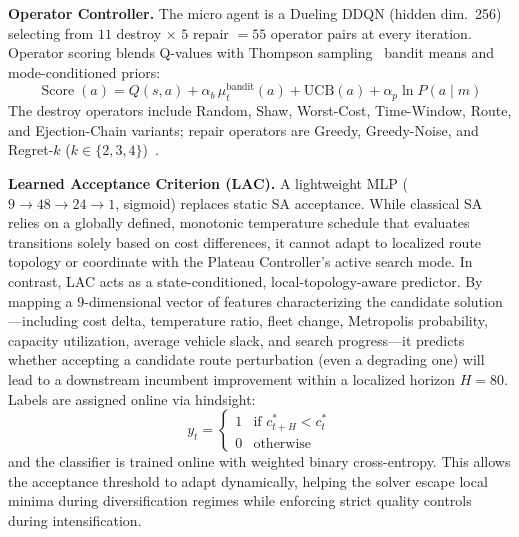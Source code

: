 \documentclass[conference]{IEEEtran}
\begin{document}
\textbf{Operator Controller.}
The micro agent is a Dueling DDQN (hidden dim.\ 256) selecting from
$11$ destroy $\times$ $5$ repair $= 55$ operator pairs at every
iteration.  Operator scoring blends Q-values with Thompson
sampling~\cite{thompson1933likelihood} bandit means and mode-conditioned
priors:
\begin{equation}
  \operatorname{Score}(a) = Q(s,a) + \alpha_b\,\mu_t^{\text{bandit}}(a)
    + \text{UCB}(a) + \alpha_p\ln P(a \mid m)
  \label{eq:score}
\end{equation}
The destroy operators include Random, Shaw, Worst-Cost, Time-Window, Route,
and Ejection-Chain variants; repair operators are Greedy, Greedy-Noise,
and Regret-$k$ ($k\!\in\!\{2,3,4\}$)~\cite{pisinger2007general}.

\textbf{Learned Acceptance Criterion (LAC).}
A lightweight MLP ($9{\to}48{\to}24{\to}1$, sigmoid) replaces static SA acceptance.
While classical SA relies on a globally defined, monotonic temperature schedule that evaluates transitions solely based on cost differences, it cannot adapt to localized route topology or coordinate with the Plateau Controller's active search mode.
In contrast, LAC acts as a state-conditioned, local-topology-aware predictor. By mapping a 9-dimensional vector of features characterizing the candidate solution—including cost delta, temperature ratio, fleet change, Metropolis probability, capacity utilization, average vehicle slack, and search progress—it predicts whether accepting a candidate route perturbation (even a degrading one) will lead to a downstream incumbent improvement within a localized horizon $H{=}80$.
Labels are assigned online via hindsight:
\begin{equation}
  y_t = \begin{cases}
    1 & \text{if } c^*_{t+H} < c^*_t \\
    0 & \text{otherwise}
  \end{cases}
  \label{eq:lac}
\end{equation}
and the classifier is trained online with weighted binary cross-entropy. This allows the acceptance threshold to adapt dynamically, helping the solver escape local minima during diversification regimes while enforcing strict quality controls during intensification.
\end{document}
